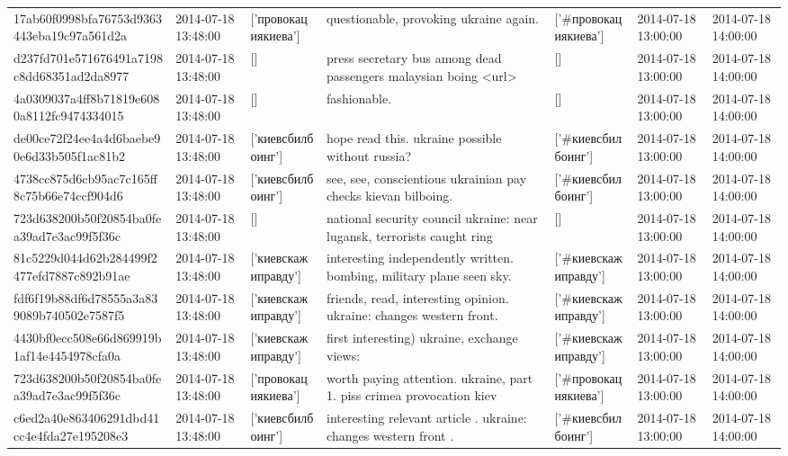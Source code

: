 \begin{tabular}{lllllll}
17ab60f0998bfa76753d9363443eba19c97a561d2a & 2014-07-18 13:48:00 & ['провокациякиева'] & questionable, provoking ukraine again. & ['#провокациякиева'] & 2014-07-18 13:00:00 & 2014-07-18 14:00:00 \\
d237fd701e571676491a7198c8dd68351ad2da8977 & 2014-07-18 13:48:00 & [] & press secretary bus among dead passengers malaysian boing <url> & [] & 2014-07-18 13:00:00 & 2014-07-18 14:00:00 \\
4a0309037a4ff8b71819e6080a8112fc9474334015 & 2014-07-18 13:48:00 & [] & fashionable. & [] & 2014-07-18 13:00:00 & 2014-07-18 14:00:00 \\
de00ce72f24ee4a4d6baebe90e6d33b505f1ac81b2 & 2014-07-18 13:48:00 & ['киевсбилбоинг'] & hope read this. ukraine possible without russia? & ['#киевсбилбоинг'] & 2014-07-18 13:00:00 & 2014-07-18 14:00:00 \\
4738cc875d6cb95ac7c165ff8c75b66e74ccf904d6 & 2014-07-18 13:48:00 & ['киевсбилбоинг'] & see, see, conscientious ukrainian pay checks kievan bilboing. & ['#киевсбилбоинг'] & 2014-07-18 13:00:00 & 2014-07-18 14:00:00 \\
723d638200b50f20854ba0fea39ad7e3ac99f5f36c & 2014-07-18 13:48:00 & [] & national security council ukraine: near lugansk, terrorists caught ring & [] & 2014-07-18 13:00:00 & 2014-07-18 14:00:00 \\
81c5229d044d62b284499f2477efd7887c892b91ae & 2014-07-18 13:48:00 & ['киевскажиправду'] & interesting independently written. bombing, military plane seen sky. & ['#киевскажиправду'] & 2014-07-18 13:00:00 & 2014-07-18 14:00:00 \\
fdf6f19b88df6d78555a3a839089b740502e7587f5 & 2014-07-18 13:48:00 & ['киевскажиправду'] & friends, read, interesting opinion. ukraine: changes western front. & ['#киевскажиправду'] & 2014-07-18 13:00:00 & 2014-07-18 14:00:00 \\
4430bf0ecc508e66d869919b1af14e4454978cfa0a & 2014-07-18 13:48:00 & ['киевскажиправду'] & first interesting) ukraine, exchange views: & ['#киевскажиправду'] & 2014-07-18 13:00:00 & 2014-07-18 14:00:00 \\
723d638200b50f20854ba0fea39ad7e3ac99f5f36c & 2014-07-18 13:48:00 & ['провокациякиева'] & worth paying attention. ukraine, part 1. piss crimea provocation kiev & ['#провокациякиева'] & 2014-07-18 13:00:00 & 2014-07-18 14:00:00 \\
c6ed2a40e863406291dbd41cc4e4fda27e195208e3 & 2014-07-18 13:48:00 & ['киевсбилбоинг'] & interesting relevant article . ukraine: changes western front . & ['#киевсбилбоинг'] & 2014-07-18 13:00:00 & 2014-07-18 14:00:00 \\

\end{tabular}
